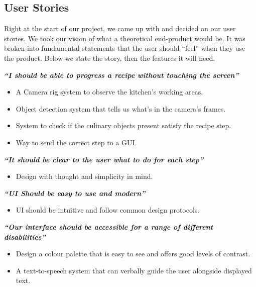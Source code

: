 \documentclass{article}
\begin{document}
    \subsection{User Stories}
    Right at the start of our project, we came up with and decided on our user stories. We took our vision of what a theoretical end-product would be. It was broken into fundamental statements that the user should “feel” when they use the product. Below we state the story, then the features it will need.

    \begin{center}
        \textbf{\textit{“I should be able to progress a recipe without touching the screen”}}
        \begin{itemize}
            \item A Camera rig system to observe the kitchen's working areas.
            \item Object detection system that tells us what’s in the camera's frames. 
            \item System to check if the culinary objects present satisfy the recipe step.
            \item Way to send the correct step to a GUI.
        \end{itemize}
        
        \textbf{\textit{“It should be clear to the user what to do for each step”}}
        \begin{itemize}
            \item Design with thought and simplicity in mind.
        \end{itemize}
        \textbf{\textit{“UI Should be easy to use and modern”}}
        \begin{itemize}
            \item UI should be intuitive and follow common design protocols.
        \end{itemize}
        
        \textbf{\textit{“Our interface should be accessible for a range of different disabilities”}}
        \begin{itemize}
            \item Design a colour palette that is easy to see and offers good levels of contrast.
            \item A text-to-speech system that can verbally guide the user alongside displayed text.
        \end{itemize}
        
    \end{center}
\end{document}
